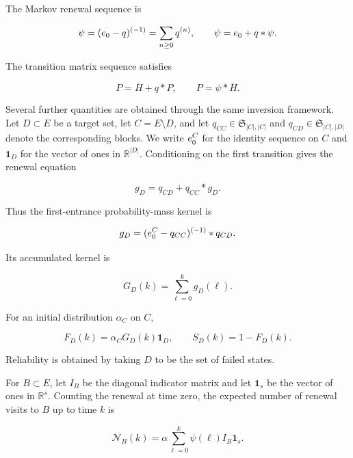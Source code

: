\documentclass[3p,12pt,authoryear]{elsarticle}
\theoremstyle{definition}
\theoremstyle{remark}
\newcommand{\R}{\mathbb R}
\newcommand{\ez}{e_{\mathstrut 0}}
\newcommand{\ezC}{e_{\mathstrut 0}^{C}}
\newcommand{\one}{\mathbf 1}
\begin{document}
The Markov renewal sequence is

\begin{equation}\label{eq:renewal-sequence}
\psi=(\ez-q)^{(-1)}=\sum_{n\geq0}q^{(n)},
\qquad
\psi=\ez+q*\psi.
\end{equation}

The transition matrix sequence satisfies

\begin{equation}\label{eq:transition-discrete}
P=\overline H+q*P,
\qquad
P=\psi*\overline H.
\end{equation}


Several further quantities are obtained through the same inversion framework. Let $D\subset E$ be a target set, let $C=E\setminus D$, and let $q_{CC}\in\mathfrak S_{|C|,|C|}$ and $q_{CD}\in\mathfrak S_{|C|,|D|}$ denote the corresponding blocks. We write $\ezC$ for the identity sequence on $C$ and $\one_D$ for the vector of ones in $\R^{|D|}$. Conditioning on the first transition gives the renewal equation

\begin{equation*}
g_D=q_{CD}+q_{CC}*g_D.
\end{equation*}

Thus the first-entrance probability-mass kernel is

\begin{equation}\label{eq:first-entrance-mass}
g_D=(\ezC-q_{CC})^{(-1)}*q_{CD}.
\end{equation}

Its accumulated kernel is

\begin{equation*}
G_D(k)=\sum_{\ell=0}^{k}g_D(\ell).
\end{equation*}

For an initial distribution $\alpha_C$ on $C$,

\begin{equation}\label{eq:first-entrance-cdf}
F_D(k)=\alpha_CG_D(k)\one_D,
\qquad
S_D(k)=1-F_D(k).
\end{equation}

Reliability is obtained by taking $D$ to be the set of failed states.

For $B\subset E$, let $I_B$ be the diagonal indicator matrix and let $\one_s$ be the vector of ones in $\R^s$. Counting the renewal at time zero, the expected number of renewal visits to $B$ up to time $k$ is

\begin{equation}\label{eq:renewal-visits}
\mathcal N_B(k)
=
\alpha\sum_{\ell=0}^{k}\psi(\ell)I_B\one_s.
\end{equation}
\end{document}
